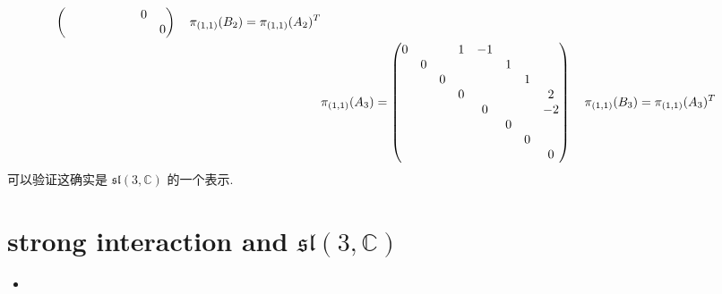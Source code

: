 \begin{itemize}
\begin{align}
\begin{pmatrix}
			& & & & & & 0 & \\
			& & & & & & & 0
		\end{pmatrix} \quad \pi_{(1, 1)}(B_2) = \pi_{(1, 1)}(A_2)^T \notag \\
		& \pi_{(1, 1)}(A_3) = \begin{pmatrix}
			0 & & & 1 & - 1 & & & \\
			& 0 & & & & 1 & & \\
			& & 0 & & & & 1 & \\
			& & & 0 & & & & 2 \\
			& & & & 0 & & & - 2 \\
			& & & & & 0 & & \\
			& & & & & & 0 & \\
			& & & & & & & 0
		\end{pmatrix} \quad \pi_{(1, 1)}(B_3) = \pi_{(1, 1)}(A_3)^T
	\end{align}
	可以验证这确实是 $\mathfrak{sl}(3, \mathbb{C})$ 的一个表示.
\end{itemize}

\section{strong interaction and \texorpdfstring{$\mathfrak{sl}(3, \mathbb{C})$}{sl(3, C)}}
\begin{itemize}
	\item 
\end{itemize}
